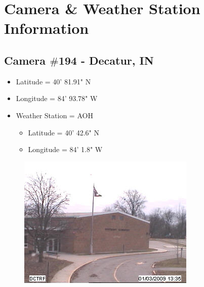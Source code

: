 \chapter{Camera  \& Weather Station Information}
\label{app:cameras}

\section{Camera $\#$194 - Decatur, IN}
\begin{itemize}
	\item Latitude = 40' 81.91" N
	\item Longitude = 84' 93.78" W
	\item Weather Station = AOH
	\begin{itemize}
		\item Latitude = 40' 42.6" N
		\item Longitude = 84' 1.8" W
	\end{itemize}
\end{itemize}
 \begin{figure}[ht]
		\centering
		\includegraphics{figures/194.jpg}
\end{figure}

